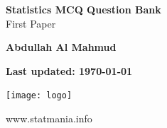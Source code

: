 \documentclass{exam}
\begin{document}
\begin{titlepage}
    \begin{center}
        \vspace*{1cm}
            
        \Huge
        \textbf{Statistics MCQ Question Bank} \\
        
       
            
        \vspace{0.5cm}
        \LARGE
        First Paper \\

            
        \vspace{1.5cm}
            
        \textbf{Abdullah Al Mahmud}
            
        \vfill
            
            \textbf{Last updated: \today}
        \vspace{0.8cm}
        
             \texttt{[image: logo]}
            
        \Large
        www.statmania.info\\
            
    \end{center}
\end{titlepage}
\end{document}
